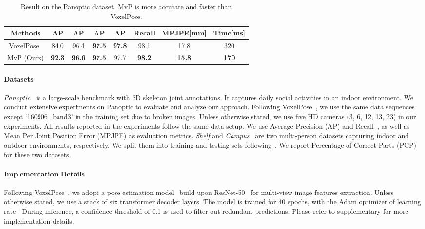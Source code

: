 \documentclass{article}
\begin{document}
\begin{table}[b]
	\renewcommand{\tabcolsep}{4pt}
	\centering
	\small
	\caption{Result on the Panoptic dataset. MvP is more accurate and faster than VoxelPose. }
	\begin{tabular}{cccccccc}
	\toprule
	Methods & AP & AP & AP &  AP & Recall & MPJPE[mm] & Time[ms] \\
	\midrule
	VoxelPose~\cite{Tu2020} & 84.0 & 96.4 & \textbf{97.5} & \textbf{97.8} & 98.1 & 17.8 & 320\\
	MvP (Ours) &\textbf{92.3} & \textbf{96.6} & \textbf{97.5} & 97.7 & \textbf{98.2} & \textbf{15.8} & \textbf{170}\\
	\bottomrule
	\end{tabular}
	\label{panoptic_main}
\end{table}

\paragraph{Datasets}
\textit{Panoptic}~\cite{joo2017panoptic}  is a large-scale benchmark with 3D skeleton joint annotations. It captures daily social activities in an indoor environment. 
We conduct extensive experiments on Panoptic to evaluate and analyze our approach.
Following VoxelPose~\cite{Tu2020}, we use the same data sequences except `160906\_band3' in the training set due to broken images. Unless otherwise stated, we use five HD cameras (3, 6, 12, 13, 23) in our experiments. All results reported in the experiments follow the same data setup. We use Average Precision (AP) and Recall~\cite{Tu2020}, as well as Mean Per Joint Position Error (MPJPE) as evaluation metrics.
\textit{Shelf} and \textit{Campus}~\cite{belagiannis20143d}  are two multi-person datasets capturing indoor and outdoor environments, respectively. We split them into training and testing sets following~\cite{belagiannis20143d,dong2019fast,Tu2020}. We report Percentage of Correct Parts (PCP) for these two datasets.

\paragraph{Implementation Details}
Following VoxelPose~\cite{Tu2020}, we adopt a pose estimation model~\cite{xiao2018simple} build upon ResNet-50~\cite{he2016deep} for multi-view image features extraction. 
Unless otherwise stated, we use a stack of six transformer decoder layers. The model is trained for 40 epochs, with the Adam optimizer of learning rate . During inference, a confidence threshold of 0.1 is used to filter out redundant predictions. Please refer to supplementary for more implementation details.
\end{document}
